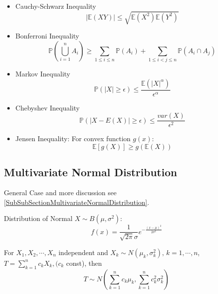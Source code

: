 \begin{itemize}
    \item Cauchy-Schwarz Inequality
    \begin{equation}
        \left\vert \mathbb{E}(XY) \right\vert\leq \sqrt{\mathbb{E}(X^2)\mathbb{E}(Y^2)}
    \end{equation}

    \item Bonferroni Inequality
\begin{equation}    \mathbb{P}(\bigcup_{i=1}^n A_i)\geq \sum_{1\leq i\leq n}  \mathbb{P}(A_i)+\sum_{1\leq i <j\leq n}  \mathbb{P}(A_i\cap A_j)
\end{equation}
    \item Markov Inequality
\begin{equation}     \mathbb{P}(|X|\geq \epsilon)\leq\frac{\mathbb{E}(|X|^\alpha)}{\epsilon^\alpha}
\end{equation}

    \item Chebyshev Inequality
\begin{equation}     \mathbb{P}(|X-E(X)|\geq\epsilon)\leq\frac{var(X)}{\epsilon^2}
\end{equation}
    \item Jensen Inequality: For convex function $g(x)$:
\begin{equation}    \mathbb{E}[g(X)]\geq g(\mathbb{E}(X))
\end{equation}

\end{itemize}


\subsection{Multivariate Normal Distribution}\label{SubsectionDerivationMultivariateNormal}
    General Case and more discussion see \autoref{SubSubSectionMultivariateNormalDistribution}.

    Distribution of Normal $ X\sim B(\mu ,\sigma ^2) $:
    \[
        f(x)=\dfrac{1}{\sqrt{2\pi}\sigma }e^{-\frac{(x-\mu )^2}{2\sigma ^2}} 
    \]
    
    

    For $X_1,X_2,\cdots,X_n$ independent and $X_k\sim N(\mu_k,\sigma^2_k),\, k=1,\cdots,n$, $T={\displaystyle\sum_{k=1}^n c_kX_k}, (c_k$ const), then
    \begin{equation}
        T\sim N(\sum_{k=1}^nc_k\mu_k,\sum_{k=1}^n c_k^2\sigma^2_k)    
    \end{equation}

